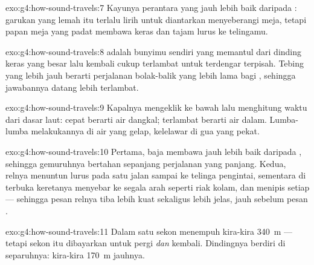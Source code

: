 \begin{solution}{exo:g4:how-sound-travels:7}
Kayunya perantara yang jauh lebih baik daripada : garukan yang
lemah itu terlalu lirih untuk diantarkan  menyeberangi meja,
tetapi papan meja yang padat membawa  keras dan tajam lurus
ke telingamu.
\end{solution}

\begin{solution}{exo:g4:how-sound-travels:8}
 adalah bunyimu sendiri yang memantul dari dinding keras yang
besar lalu kembali cukup terlambat untuk terdengar terpisah. Tebing
yang lebih jauh berarti perjalanan bolak-balik yang lebih lama bagi
, sehingga jawabannya datang lebih terlambat.
\end{solution}

\begin{solution}{exo:g4:how-sound-travels:9}
Kapalnya mengeklik ke bawah lalu menghitung waktu  dari dasar
laut:  cepat berarti air dangkal;  terlambat berarti air
dalam. Lumba-lumba melakukannya di air yang gelap, kelelawar di gua
yang pekat.
\end{solution}

\begin{solution}{exo:g4:how-sound-travels:10}
Pertama, baja membawa  jauh lebih baik daripada , sehingga
gemuruhnya bertahan sepanjang perjalanan yang panjang. Kedua, relnya
menuntun  lurus pada satu jalan sampai ke telinga pengintai,
sementara di  terbuka  keretanya menyebar ke segala arah
seperti riak kolam, dan menipis setiap  --- sehingga pesan
relnya tiba lebih kuat sekaligus lebih jelas, jauh sebelum pesan
.
\end{solution}

\begin{solution}{exo:g4:how-sound-travels:11}
Dalam satu sekon  menempuh kira-kira \qty{340}{m} --- tetapi
sekon itu dibayarkan untuk pergi \emph{dan} kembali. Dindingnya
berdiri di separuhnya: kira-kira \qty{170}{m} jauhnya.
\end{solution}
